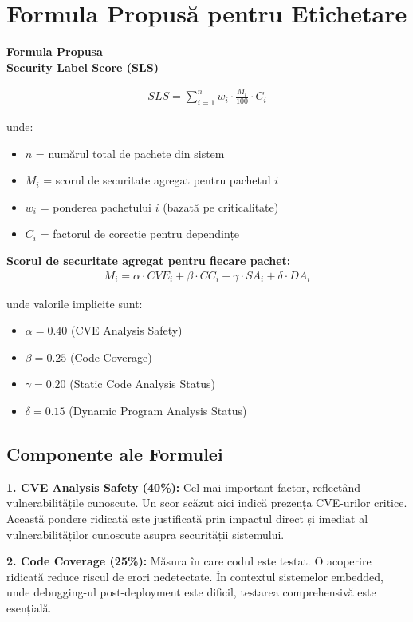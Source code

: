 \documentclass[12pt,a4paper]{article}
\newenvironment{formulabox}{%
\begin{leftbar}
\color{black}
\textbf{Formula Propusa}\\[0.5em]
}{%
\end{leftbar}
}
\begin{document}
\section{Formula Propusă pentru Etichetare}

\begin{formulabox}
\textbf{Security Label Score (SLS)}

\begin{align}
SLS = \sum_{i=1}^{n} w_i \cdot \frac{M_i}{100} \cdot C_i
\end{align}

unde:
\begin{itemize}
\item $n$ = numărul total de pachete din sistem
\item $M_i$ = scorul de securitate agregat pentru pachetul $i$
\item $w_i$ = ponderea pachetului $i$ (bazată pe criticalitate)
\item $C_i$ = factorul de corecție pentru dependințe
\end{itemize}

\textbf{Scorul de securitate agregat pentru fiecare pachet:}
\begin{align}
M_i = \alpha \cdot CVE_i + \beta \cdot CC_i + \gamma \cdot SA_i + \delta \cdot DA_i
\end{align}

unde valorile implicite sunt:
\begin{itemize}
\item $\alpha = 0.40$ (CVE Analysis Safety)
\item $\beta = 0.25$ (Code Coverage)
\item $\gamma = 0.20$ (Static Code Analysis Status)
\item $\delta = 0.15$ (Dynamic Program Analysis Status)
\end{itemize}
\end{formulabox}

\subsection{Componente ale Formulei}

\textbf{1. CVE Analysis Safety (40\%):} Cel mai important factor, reflectând vulnerabilitățile cunoscute. Un scor scăzut aici indică prezența CVE-urilor critice. Această pondere ridicată este justificată prin impactul direct și imediat al vulnerabilităților cunoscute asupra securității sistemului.

\textbf{2. Code Coverage (25\%):} Măsura în care codul este testat. O acoperire ridicată reduce riscul de erori nedetectate. În contextul sistemelor embedded, unde debugging-ul post-deployment este dificil, testarea comprehensivă este esențială.
\end{document}

